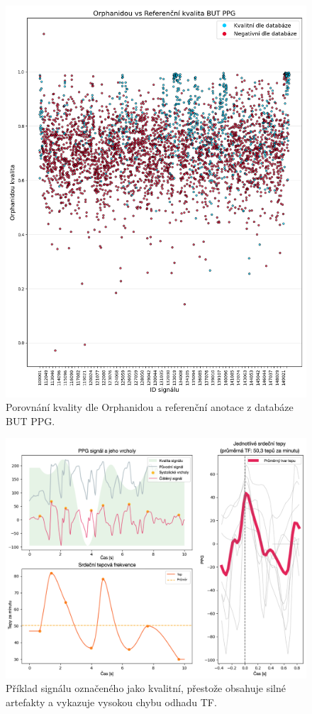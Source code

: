 \begin{figure}[ht]
	\centering
	\includegraphics[width=1\textwidth]{./obrazky/quality/Orphanidou_Ref_Q.png}
	\caption[Porovnání kvality dle Orphanidou a referenční anotace z databáze \acs{BUT PPG}]{Porovnání kvality dle Orphanidou a referenční anotace z databáze \acs{BUT PPG}.}
	\label{fig:orphanidou_mismatch}
\end{figure}

\begin{figure}[ht]
	\centering
	\includegraphics[width=1\textwidth]{./obrazky/quality/good_but_not_good.png}
	\caption[Signál označený databází za kvalitní]{Příklad signálu označeného jako kvalitní, přestože obsahuje silné artefakty a vykazuje vysokou chybu odhadu \acs{TF}.}
	\label{fig:bad_quality_passed}
\end{figure}
